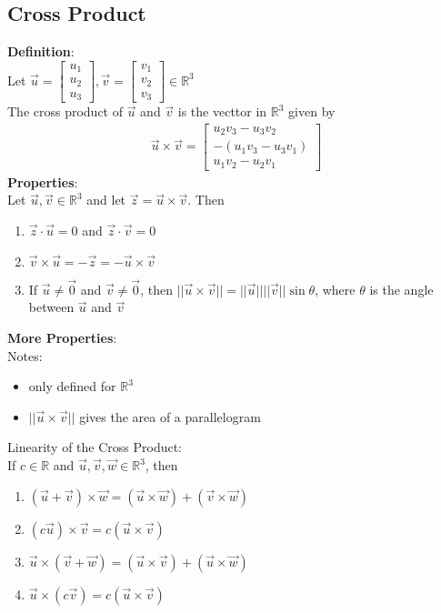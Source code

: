 \documentclass[12pt, letterpaper]{article}
\begin{document}
\subsection{Cross Product}
\textbf{Definition}: \\
Let $\vec{u} = \begin{bmatrix}
    u_1 \\ u_2 \\ u_3
\end{bmatrix}, \vec{v} = \begin{bmatrix}
    v_1 \\ v_2 \\ v_3
\end{bmatrix} \in\mathbb{R}^3$ \\
The cross product of $\vec{u}$ and $\vec{v}$ is the vecttor in $\mathbb{R}^3$ given by
\begin{align*}
    \vec{u} \times \vec{v} = \begin{bmatrix}
        u_2v_3 - u_3v_2 \\
        -(u_1v_3 - u_3v_1) \\
        u_1v_2 - u_2v_1
    \end{bmatrix}
\end{align*}
\textbf{Properties}: \\
Let $\vec{u},\vec{v}\in\mathbb{R}^3$ and let $\vec{z}=\vec{u}\times\vec{v}$. Then
\begin{enumerate}
    \item $\vec{z}\cdot\vec{u}=0$ and $\vec{z}\cdot\vec{v}=0$
    \item $\vec{v}\times\vec{u}=-\vec{z}=-\vec{u}\times\vec{v}$
    \item If $\vec{u}\neq\vec{0}$ and $\vec{v}\neq\vec{0}$, then $||\vec{u}\times\vec{v}||=||\vec{u}||||\vec{v}||\sin\theta$, where $\theta$ is the angle between $\vec{u}$ and $\vec{v}$
\end{enumerate}
\textbf{More Properties}: \\
Notes: 
\begin{itemize}
    \item only defined for $\mathbb{R}^3$
    \item $||\vec{u}\times\vec{v}||$ gives the area of a parallelogram
\end{itemize}
Linearity of the Cross Product: \\
If $c\in\mathbb{R}$ and $\vec{u},\vec{v},\vec{w}\in\mathbb{R}^3$, then
\begin{enumerate}
    \item $(\vec{u}+\vec{v})\times\vec{w} = (\vec{u}\times\vec{w})+(\vec{v}\times\vec{w})$
    \item $(c\vec{u})\times\vec{v} = c(\vec{u}\times\vec{v})$
    \item $\vec{u}\times(\vec{v}+\vec{w}) = (\vec{u}\times\vec{v}) + (\vec{u}\times\vec{w})$
    \item $\vec{u}\times(c\vec{v}) = c(\vec{u}\times\vec{v})$
\end{enumerate}
\end{document}
